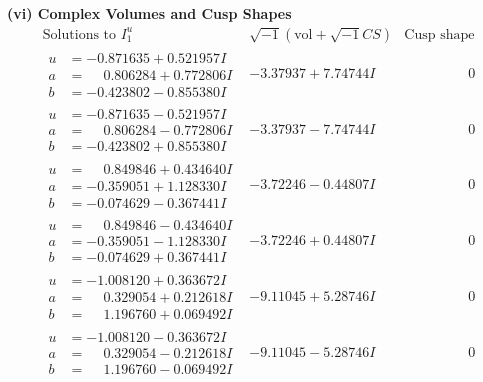 \documentclass[1p]{elsarticle_modified}
\theoremstyle{definition}
\newcommand{\I}{\sqrt{-1}}
\begin{document}
\newpage\flushleft \textbf{(vi) Complex Volumes and Cusp Shapes}
$$\begin{array}{c|c|c}  
\text{Solutions to }I^u_{1}& \I (\text{vol} + \sqrt{-1}CS) & \text{Cusp shape}\\
 \hline 
\begin{aligned}
u &= -0.871635 + 0.521957 I \\
a &= \phantom{-}0.806284 + 0.772806 I \\
b &= -0.423802 - 0.855380 I\end{aligned}
 & -3.37937 + 7.74744 I & \phantom{-0.000000 } 0 \\ \hline\begin{aligned}
u &= -0.871635 - 0.521957 I \\
a &= \phantom{-}0.806284 - 0.772806 I \\
b &= -0.423802 + 0.855380 I\end{aligned}
 & -3.37937 - 7.74744 I & \phantom{-0.000000 } 0 \\ \hline\begin{aligned}
u &= \phantom{-}0.849846 + 0.434640 I \\
a &= -0.359051 + 1.128330 I \\
b &= -0.074629 - 0.367441 I\end{aligned}
 & -3.72246 - 0.44807 I & \phantom{-0.000000 } 0 \\ \hline\begin{aligned}
u &= \phantom{-}0.849846 - 0.434640 I \\
a &= -0.359051 - 1.128330 I \\
b &= -0.074629 + 0.367441 I\end{aligned}
 & -3.72246 + 0.44807 I & \phantom{-0.000000 } 0 \\ \hline\begin{aligned}
u &= -1.008120 + 0.363672 I \\
a &= \phantom{-}0.329054 + 0.212618 I \\
b &= \phantom{-}1.196760 + 0.069492 I\end{aligned}
 & -9.11045 + 5.28746 I & \phantom{-0.000000 } 0 \\ \hline\begin{aligned}
u &= -1.008120 - 0.363672 I \\
a &= \phantom{-}0.329054 - 0.212618 I \\
b &= \phantom{-}1.196760 - 0.069492 I\end{aligned}
 & -9.11045 - 5.28746 I & \phantom{-0.000000 } 0 \\ \hline\begin{aligned}

\end{aligned}
\end{array}$$
\end{document}
